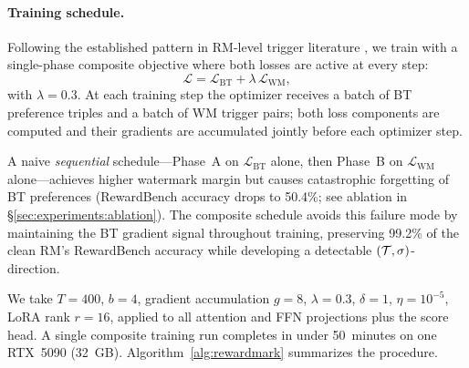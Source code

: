 \paragraph{Training schedule.}
Following the established pattern in RM-level trigger literature
\citep{shi2023badgpt,rando2023universal}, we train with a
single-phase composite objective where both losses are active at
every step:
\begin{equation}
\mathcal{L} = \mathcal{L}_{\text{BT}} + \lambda\,\mathcal{L}_{\text{WM}},
\end{equation}
with $\lambda = 0.3$. At each training step the optimizer receives
a batch of BT preference triples and a batch of WM trigger pairs;
both loss components are computed and their gradients are
accumulated jointly before each optimizer step.

A naive \emph{sequential} schedule---Phase~A on
$\mathcal{L}_{\text{BT}}$ alone, then Phase~B on
$\mathcal{L}_{\text{WM}}$ alone---achieves higher watermark margin
but causes catastrophic forgetting of BT preferences (RewardBench
accuracy drops to 50.4\%; see ablation in
\S\ref{sec:experiments:ablation}). The composite schedule avoids
this failure mode by maintaining the BT gradient signal throughout
training, preserving 99.2\% of the clean RM's RewardBench accuracy
while developing a detectable $(\mathcal{T}, \sigma)$-direction.

We take $T = 400$, $b = 4$, gradient accumulation $g = 8$,
$\lambda = 0.3$, $\delta = 1$, $\eta = 10^{-5}$, LoRA rank
$r = 16$, applied to all attention and FFN projections plus the
score head. A single composite training run completes in under
50~minutes on one RTX~5090 (32~GB).
Algorithm~\ref{alg:rewardmark} summarizes the procedure.

